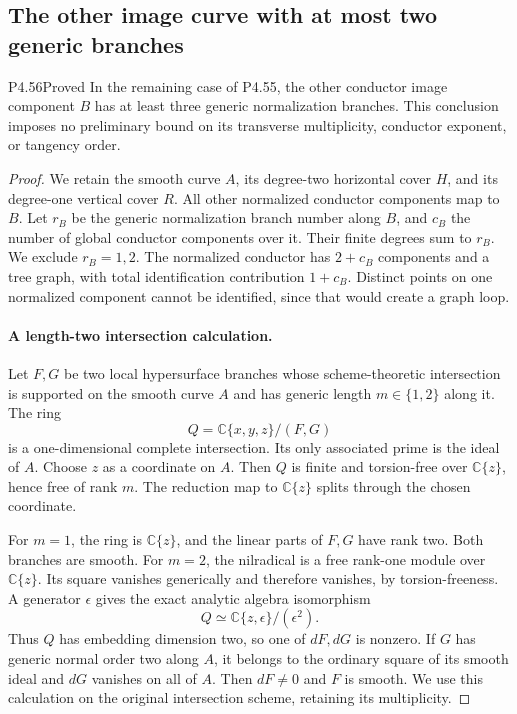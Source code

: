 \subsection{The other image curve with at most two generic branches}

\begin{statement}{P4.56}{Proved}
In the remaining case of P4.55, the other conductor image
component $B$ has at least three generic normalization
branches. This conclusion imposes no preliminary bound on
its transverse multiplicity, conductor exponent, or tangency
order.
\end{statement}
\begin{proof}
We retain the smooth curve $A$, its degree-two horizontal
cover $H$, and its degree-one vertical cover $R$. All other
normalized conductor components map to $B$. Let $r_B$ be
the generic normalization branch number along $B$, and
$c_B$ the number of global conductor components over it.
Their finite degrees sum to $r_B$. We exclude $r_B=1,2$.
The normalized conductor has $2+c_B$ components and a tree
graph, with total identification contribution $1+c_B$.
Distinct points on one normalized component cannot be
identified, since that would create a graph loop.

\paragraph{A length-two intersection calculation.}
Let $F,G$ be two local hypersurface branches whose
scheme-theoretic intersection is supported on the smooth
curve $A$ and has generic length $m\in\{1,2\}$ along it.
The ring
\[
                 Q=\mathbb C\{x,y,z\}/(F,G)
\]
is a one-dimensional complete intersection. Its only
associated prime is the ideal of $A$. Choose $z$ as a
coordinate on $A$. Then $Q$ is finite and torsion-free
over $\mathbb C\{z\}$, hence free of rank $m$. The
reduction map to $\mathbb C\{z\}$ splits through the
chosen coordinate.

For $m=1$, the ring is $\mathbb C\{z\}$, and the linear
parts of $F,G$ have rank two. Both branches are smooth.
For $m=2$, the nilradical is a free rank-one module over
$\mathbb C\{z\}$. Its square vanishes generically and
therefore vanishes, by torsion-freeness. A generator
$\epsilon$ gives the exact analytic algebra isomorphism
\[
                    Q\simeq\mathbb C\{z,\epsilon\}/(\epsilon^2).
                                                            \tag{4.56a}
\]
Thus $Q$ has embedding dimension two, so one of $dF,dG$
is nonzero. If $G$ has generic normal order two along $A$,
it belongs to the ordinary square of its smooth ideal and
$dG$ vanishes on all of $A$. Then $dF\ne0$ and $F$ is
smooth. We use this calculation on the original intersection
scheme, retaining its multiplicity.


\end{proof}
